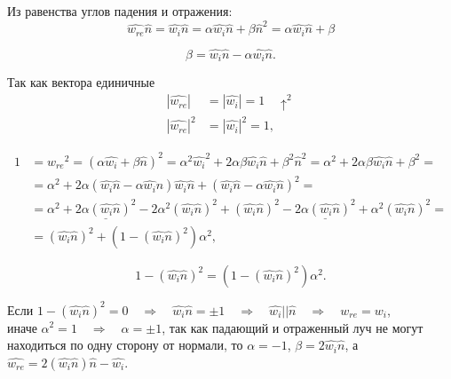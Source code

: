 Из равенства углов падения и отражения:
\[ \widehat{w_{re}} \widehat{n} = \widehat{w_i} \widehat{n}
   = \alpha \widehat{w_i} \widehat{n} + \beta \widehat{n}^2
   = \alpha \widehat{w_i} \widehat{n} + \beta \]

\[ \beta = \widehat{w_i} \widehat{n} - \alpha \widehat{w_i} \widehat{n}. \]

Так как вектора единичные
\begin{align*}
    |\widehat{w_{re}}| & = |\widehat{w_i}| = 1 \quad \uparrow^2 \\
    |\widehat{w_{re}}|^2 & = |\widehat{w_i}|^2 = 1,
\end{align*}

\begin{align*}
    1 & = {w_{re}}^2 = (\alpha \widehat{w_i} + \beta \widehat{n})^2
        = \alpha^2 \widehat{w_i}^2 + 2 \alpha \beta \widehat{w_i} \widehat{n}
          + \beta^2 \widehat{n}^2
        = \alpha^2 + 2 \alpha \beta \widehat{w_i} \widehat{n} + \beta^2 = \\
      & = \alpha^2 + 2 \alpha (\widehat{w_i} \widehat{n}
                               - \alpha \widehat{w_i} \widehat{n})
                     \widehat{w_i} \widehat{n} + (\widehat{w_i} \widehat{n}
                                                  - \alpha \widehat{w_i} \widehat{n})^2 = \\
      & = \alpha^2 
          + \underline{2 \alpha (\widehat{w_i} \widehat{n})^2}
          - 2 \alpha^2 (\widehat{w_i} \widehat{n})^2
          + (\widehat{w_i} \widehat{n})^2
          - \underline{2 \alpha (\widehat{w_i} \widehat{n})^2}
          + \alpha^2 (\widehat{w_i} \widehat{n})^2 = \\
      & = (\widehat{w_i} \widehat{n})^2
          + (1 - (\widehat{w_i} \widehat{n})^2) \alpha^2,
\end{align*}

\[ 1 - (\widehat{w_i} \widehat{n})^2 = (1 - (\widehat{w_i} \widehat{n})^2) \alpha^2. \]

Если $1 - (\widehat{w_i} \widehat{n})^2 = 0
      \quad \Rightarrow \quad \widehat{w_i} \widehat{n} = \pm 1
      \quad \Rightarrow \quad \widehat{w_i} || \widehat{n}
      \quad \Rightarrow \quad w_{re} = w_i$, \\
иначе $\alpha^2 = 1 \quad \Rightarrow \quad \alpha = \pm 1$, так как падающий
и отраженный луч не могут находиться по одну сторону от нормали, то
$\alpha = -1$, $\beta = 2 \widehat{w_i} \widehat{n}$, а
$\widehat{w_{re}} = 2 (\widehat{w_i} \widehat{n}) \widehat{n} - \widehat{w_i}$.

